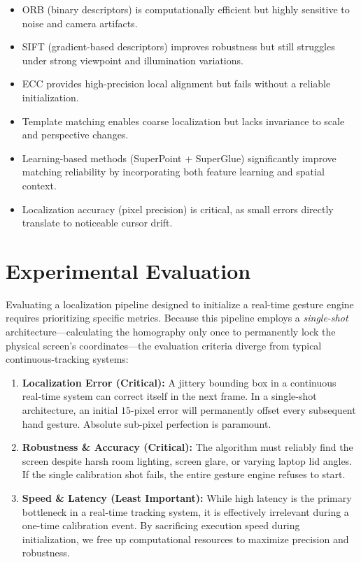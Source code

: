 \documentclass[conference]{IEEEtran}
\begin{document}
\begin{itemize}[noitemsep]
    \item ORB (binary descriptors) is computationally efficient but highly sensitive to noise and camera artifacts.
    \item SIFT (gradient-based descriptors) improves robustness but still struggles under strong viewpoint and illumination variations.
    \item ECC provides high-precision local alignment but fails without a reliable initialization.
    \item Template matching enables coarse localization but lacks invariance to scale and perspective changes.
    \item Learning-based methods (SuperPoint + SuperGlue) significantly improve matching reliability by incorporating both feature learning and spatial context.
    \item Localization accuracy (pixel precision) is critical, as small errors directly translate to noticeable cursor drift.
\end{itemize}

\section{Experimental Evaluation}

Evaluating a localization pipeline designed to initialize a real-time gesture engine requires prioritizing specific metrics. Because this pipeline employs a \textit{single-shot} architecture---calculating the homography only once to permanently lock the physical screen's coordinates---the evaluation criteria diverge from typical continuous-tracking systems:

\begin{enumerate}[noitemsep]
    \item \textbf{Localization Error (Critical):} A jittery bounding box in a continuous real-time system can correct itself in the next frame. In a single-shot architecture, an initial $15$-pixel error will permanently offset every subsequent hand gesture. Absolute sub-pixel perfection is paramount.
    \item \textbf{Robustness \& Accuracy (Critical):} The algorithm must reliably find the screen despite harsh room lighting, screen glare, or varying laptop lid angles. If the single calibration shot fails, the entire gesture engine refuses to start.
    \item \textbf{Speed \& Latency (Least Important):} While high latency is the primary bottleneck in a real-time tracking system, it is effectively irrelevant during a one-time calibration event. By sacrificing execution speed during initialization, we free up computational resources to maximize precision and robustness.
\end{enumerate}
\end{document}
